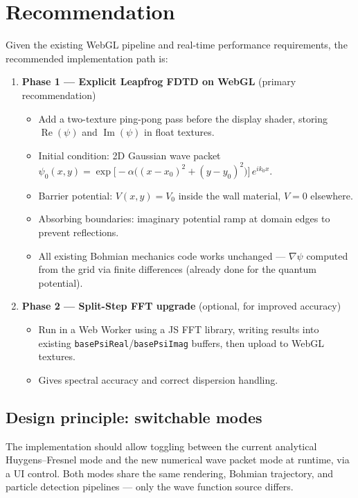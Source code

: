 \documentclass[11pt,a4paper]{article}
\begin{document}
\section{Recommendation}

Given the existing WebGL pipeline and real-time performance requirements, the recommended implementation path is:

\begin{enumerate}
  \item \textbf{Phase 1 --- Explicit Leapfrog FDTD on WebGL} (primary recommendation)
    \begin{itemize}
      \item Add a two-texture ping-pong pass before the display shader, storing $\operatorname{Re}(\psi)$ and $\operatorname{Im}(\psi)$ in float textures.
      \item Initial condition: 2D Gaussian wave packet
        $\psi_0(x,y) = \exp\bigl[-\alpha\bigl((x-x_0)^2 + (y-y_0)^2\bigr)\bigr]\,e^{ik_0 x}$.
      \item Barrier potential: $V(x,y) = V_0$ inside the wall material, $V = 0$ elsewhere.
      \item Absorbing boundaries: imaginary potential ramp at domain edges to prevent reflections.
      \item All existing Bohmian mechanics code works unchanged --- $\nabla\psi$ computed from the grid via finite differences (already done for the quantum potential).
    \end{itemize}

  \item \textbf{Phase 2 --- Split-Step FFT upgrade} (optional, for improved accuracy)
    \begin{itemize}
      \item Run in a Web Worker using a JS FFT library, writing results into existing \texttt{basePsiReal}/\texttt{basePsiImag} buffers, then upload to WebGL textures.
      \item Gives spectral accuracy and correct dispersion handling.
    \end{itemize}
\end{enumerate}

\subsection{Design principle: switchable modes}

The implementation should allow toggling between the current analytical Huygens--Fresnel mode and the new numerical wave packet mode at runtime, via a UI control. Both modes share the same rendering, Bohmian trajectory, and particle detection pipelines --- only the wave function source differs.
\end{document}
